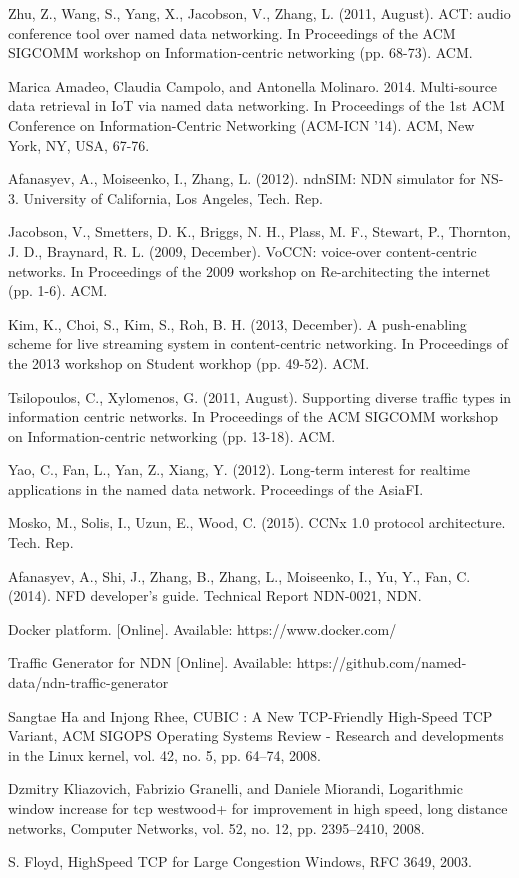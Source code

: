 \documentclass[11pt,conference]{./IEEEtran}
\begin{document}
\begin{thebibliography}{99}
Zhu, Z., Wang, S., Yang, X., Jacobson, V., Zhang, L. (2011, August). ACT: audio conference tool over named data networking. In Proceedings of the ACM SIGCOMM workshop on Information-centric networking (pp. 68-73). ACM.

Marica Amadeo, Claudia Campolo, and Antonella Molinaro. 2014. Multi-source data retrieval in IoT via named data networking. In Proceedings of the 1st ACM Conference on Information-Centric Networking (ACM-ICN '14). ACM, New York, NY, USA, 67-76. 

Afanasyev, A., Moiseenko, I., Zhang, L. (2012). ndnSIM: NDN simulator for NS-3. University of California, Los Angeles, Tech. Rep.

Jacobson, V., Smetters, D. K., Briggs, N. H., Plass, M. F., Stewart, P., Thornton, J. D., Braynard, R. L. (2009, December). VoCCN: voice-over content-centric networks. In Proceedings of the 2009 workshop on Re-architecting the internet (pp. 1-6). ACM.

Kim, K., Choi, S., Kim, S., Roh, B. H. (2013, December). A push-enabling scheme for live streaming system in content-centric networking. In Proceedings of the 2013 workshop on Student workhop (pp. 49-52). ACM.

Tsilopoulos, C., Xylomenos, G. (2011, August). Supporting diverse traffic types in information centric networks. In Proceedings of the ACM SIGCOMM workshop on Information-centric networking (pp. 13-18). ACM.

Yao, C., Fan, L., Yan, Z., Xiang, Y. (2012). Long-term interest for realtime applications in the named data network. Proceedings of the AsiaFI.

Mosko, M., Solis, I., Uzun, E., Wood, C. (2015). CCNx 1.0 protocol architecture. Tech. Rep.

Afanasyev, A., Shi, J., Zhang, B., Zhang, L., Moiseenko, I., Yu, Y., Fan, C. (2014). NFD developer’s guide. Technical Report NDN-0021, NDN.

Docker platform.
[Online]. Available:
https://www.docker.com/

Traffic Generator for NDN
[Online]. Available:
https://github.com/named-data/ndn-traffic-generator

Sangtae Ha and Injong Rhee, CUBIC : A New TCP-Friendly High-Speed TCP Variant, ACM SIGOPS Operating Systems Review - Research and developments in the Linux kernel, vol. 42, no. 5, pp. 64–74, 2008.

Dzmitry Kliazovich, Fabrizio Granelli, and Daniele Miorandi, Logarithmic window increase for tcp westwood+ for improvement in high speed, long distance networks, Computer Networks, vol. 52, no. 12, pp. 2395–2410, 2008.

S. Floyd, HighSpeed TCP for Large Congestion Windows, RFC 3649, 2003.

\end{thebibliography}
\end{document}
